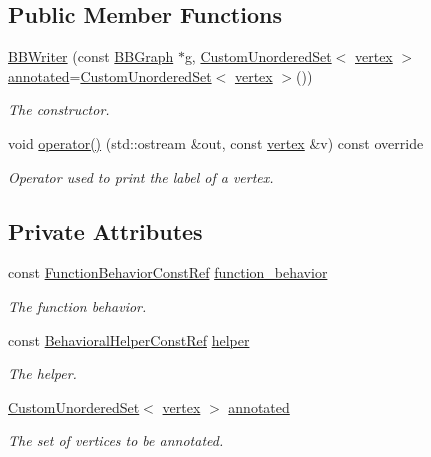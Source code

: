 \subsection*{Public Member Functions}
\begin{DoxyCompactItemize}
\item 
\hyperlink{classBBWriter_a9166ba1742ef1a0809b65fbcd2c5f1a1}{B\+B\+Writer} (const \hyperlink{structBBGraph}{B\+B\+Graph} $\ast$g, \hyperlink{classCustomUnorderedSet}{Custom\+Unordered\+Set}$<$ \hyperlink{graph_8hpp_abefdcf0544e601805af44eca032cca14}{vertex} $>$ \hyperlink{classBBWriter_a6db756c86d6b187e5add16618f0f7e36}{annotated}=\hyperlink{classCustomUnorderedSet}{Custom\+Unordered\+Set}$<$ \hyperlink{graph_8hpp_abefdcf0544e601805af44eca032cca14}{vertex} $>$())
\begin{DoxyCompactList}\small\item\em The constructor. \end{DoxyCompactList}\item 
void \hyperlink{classBBWriter_a04cb324b25410008893d31a21d347f2f}{operator()} (std\+::ostream \&out, const \hyperlink{graph_8hpp_abefdcf0544e601805af44eca032cca14}{vertex} \&v) const override
\begin{DoxyCompactList}\small\item\em Operator used to print the label of a vertex. \end{DoxyCompactList}\end{DoxyCompactItemize}
\subsection*{Private Attributes}
\begin{DoxyCompactItemize}
\item 
const \hyperlink{function__behavior_8hpp_a94872da12ed056b6ecf90456164e0213}{Function\+Behavior\+Const\+Ref} \hyperlink{classBBWriter_ad35485f2166f272131e338ae113fc5b1}{function\+\_\+behavior}
\begin{DoxyCompactList}\small\item\em The function behavior. \end{DoxyCompactList}\item 
const \hyperlink{behavioral__helper_8hpp_aae973b54cac87eef3b27442aa3e1e425}{Behavioral\+Helper\+Const\+Ref} \hyperlink{classBBWriter_aabfc82d679586f94d2110a3eb9f2d556}{helper}
\begin{DoxyCompactList}\small\item\em The helper. \end{DoxyCompactList}\item 
\hyperlink{classCustomUnorderedSet}{Custom\+Unordered\+Set}$<$ \hyperlink{graph_8hpp_abefdcf0544e601805af44eca032cca14}{vertex} $>$ \hyperlink{classBBWriter_a6db756c86d6b187e5add16618f0f7e36}{annotated}
\begin{DoxyCompactList}\small\item\em The set of vertices to be annotated. \end{DoxyCompactList}\end{DoxyCompactItemize}
